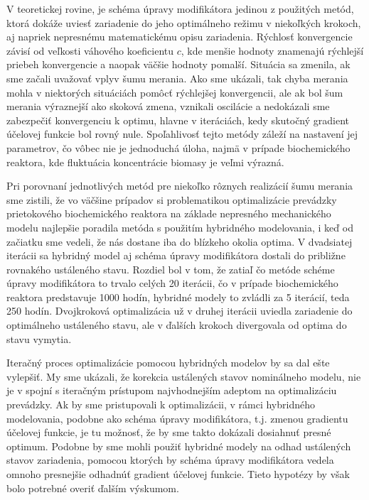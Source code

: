 V teoretickej rovine, je schéma úpravy modifikátora jedinou z použitých metód, ktorá dokáže uviesť zariadenie do jeho optimálneho režimu v niekoľkých krokoch, aj napriek nepresnému matematickému opisu zariadenia. Rýchlosť konvergencie závisí od veľkosti váhového koeficientu $ c $, kde menšie hodnoty znamenajú rýchlejší priebeh konvergencie a naopak väčšie hodnoty pomalší. Situácia sa zmenila, ak sme začali uvažovať vplyv šumu merania. Ako sme ukázali, tak chyba merania mohla v niektorých situáciách pomôcť rýchlejšej konvergencii, ale ak bol šum merania výraznejší ako skoková zmena, vznikali oscilácie a nedokázali sme zabezpečiť konvergenciu k optimu, hlavne v iteráciách, kedy skutočný gradient účelovej funkcie bol rovný nule. Spoľahlivosť tejto metódy záleží na nastavení jej parametrov, čo vôbec nie je jednoduchá úloha, najmä v prípade biochemického reaktora, kde fluktuácia koncentrácie biomasy je veľmi výrazná.

Pri porovnaní jednotlivých metód pre niekoľko rôznych realizácií šumu merania sme zistili, že vo väčšine prípadov si problematikou optimalizácie prevádzky prietokového biochemického reaktora na základe nepresného mechanického modelu najlepšie poradila metóda s použitím hybridného modelovania, i keď od začiatku sme vedeli, že nás dostane iba do blízkeho okolia optima. V dvadsiatej iterácii sa hybridný model aj schéma úpravy modifikátora dostali do približne rovnakého ustáleného stavu. Rozdiel bol v tom, že zatiaľ čo metóde schéme úpravy modifikátora to trvalo celých 20 iterácii, čo v prípade biochemického reaktora predstavuje 1000 hodín, hybridné modely to zvládli za 5 iterácií, teda 250 hodín. Dvojkroková optimalizácia už v druhej iterácii uviedla zariadenie do optimálneho ustáleného stavu, ale v ďalších krokoch divergovala od optima do stavu vymytia.

Iteračný proces optimalizácie pomocou hybridných modelov by sa dal ešte vylepšiť. My sme ukázali, že korekcia ustálených stavov nominálneho modelu, nie je v spojní s iteračným prístupom najvhodnejším adeptom na optimalizáciu prevádzky. Ak by sme pristupovali k optimalizácii, v rámci hybridného modelovania, podobne ako schéma úpravy modifikátora, t.j. zmenou gradientu účelovej funkcie, je tu možnosť, že by sme takto dokázali dosiahnuť presné optimum. Podobne by sme mohli použiť hybridné modely na odhad ustálených stavov zariadenia, pomocou ktorých by schéma úpravy modifikátora vedela omnoho presnejšie odhadnúť gradient účelovej funkcie. Tieto hypotézy by však bolo potrebné overiť ďalším výskumom.


